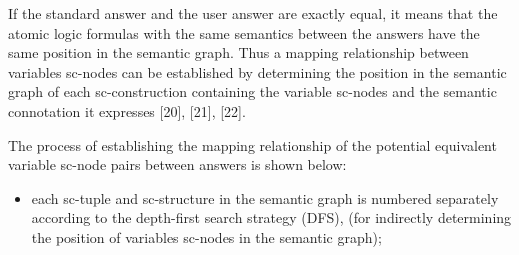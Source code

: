 \documentclass{article}
\begin{document}
If the standard answer and the user answer are exactly equal, it means that the atomic logic formulas with the same semantics between the answers have the same position in the semantic graph. Thus a mapping relationship between variables sc-nodes can be established by determining the position in the semantic graph of each sc-construction containing the variable sc-nodes and the semantic connotation it expresses [20], [21], [22].

The process of establishing the mapping relationship of the potential equivalent variable sc-node pairs between answers is shown below:
\begin{itemize}
    \item each sc-tuple and sc-structure in the semantic graph is numbered separately according to the depth-first search strategy (DFS), (for indirectly determining the position of variables sc-nodes in the semantic graph);
\end{itemize}
\end{document}
